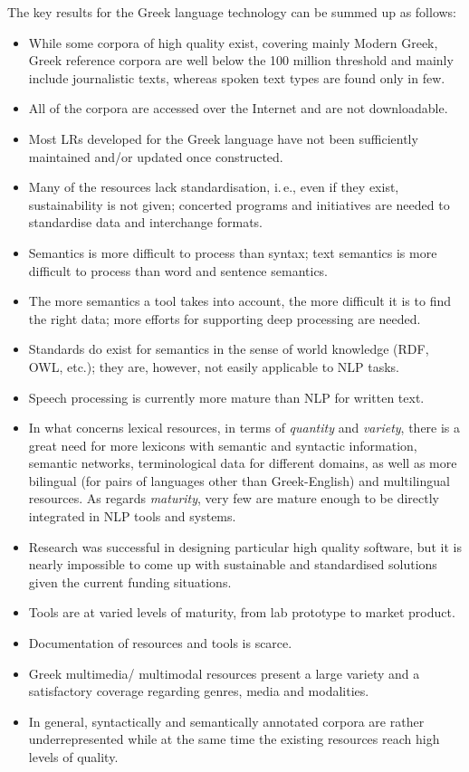 \begin{multicols}{2}
The key results for the Greek language technology can be summed up as follows:

\begin{itemize}
\item While some corpora of high quality exist, covering mainly Modern Greek, Greek reference corpora are well below the 100 million threshold and mainly include journalistic texts, whereas spoken text types are found only in few. 
\item All of the corpora are accessed over the Internet and are not downloadable. 
\item Most LRs developed for the Greek language have not been sufficiently maintained and/or updated once constructed. 
\item Many of the resources lack standardisation, i.\,e., even if they exist, sustainability is not given; concerted programs and initiatives are needed to standardise data and interchange formats. 
\item Semantics is more difficult to process than syntax; text semantics is more difficult to process than word and sentence semantics.
\item The more semantics a tool takes into account, the more difficult it is to find the right data; more efforts for supporting deep processing are needed.
\item Standards do exist for semantics in the sense of world knowledge (RDF, OWL, etc.); they are, however, not easily applicable to NLP tasks.
\item Speech processing is currently more mature than NLP for written text. 
\item In what concerns lexical resources, in terms of \textit{quantity} and \textit{variety}, there is a great need for more lexicons with semantic and syntactic information, semantic networks, terminological data for different domains, as well as more bilingual (for pairs of languages other than Greek-English) and multilingual resources. As regards \textit{maturity}, very few are mature enough to be directly integrated in NLP tools and systems. 
\item Research was successful in designing particular high quality software, but it is nearly impossible to come up with sustainable and standardised solutions given the current funding situations. 
\item Tools are at varied levels of maturity, from lab prototype to market product. 
\item Documentation of resources and tools is scarce. 
\item Greek multimedia/ multimodal resources present a large variety and a satisfactory coverage regarding genres, media and modalities. 
\item In general, syntactically and semantically annotated corpora are rather underrepresented while at the same time the existing resources reach high levels of quality. 
\end{itemize}


\end{multicols}

